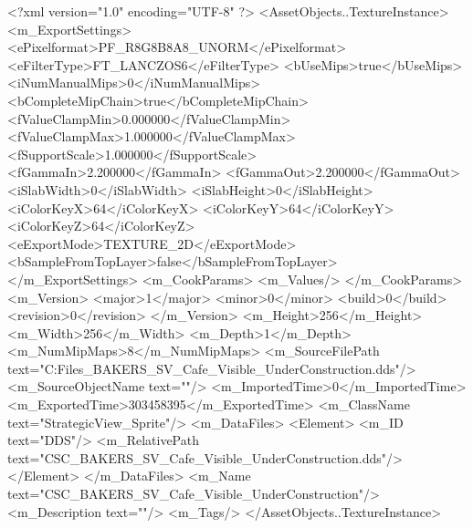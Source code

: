 <?xml version="1.0" encoding="UTF-8" ?>
<AssetObjects..TextureInstance>
	<m_ExportSettings>
		<ePixelformat>PF_R8G8B8A8_UNORM</ePixelformat>
		<eFilterType>FT_LANCZOS6</eFilterType>
		<bUseMips>true</bUseMips>
		<iNumManualMips>0</iNumManualMips>
		<bCompleteMipChain>true</bCompleteMipChain>
		<fValueClampMin>0.000000</fValueClampMin>
		<fValueClampMax>1.000000</fValueClampMax>
		<fSupportScale>1.000000</fSupportScale>
		<fGammaIn>2.200000</fGammaIn>
		<fGammaOut>2.200000</fGammaOut>
		<iSlabWidth>0</iSlabWidth>
		<iSlabHeight>0</iSlabHeight>
		<iColorKeyX>64</iColorKeyX>
		<iColorKeyY>64</iColorKeyY>
		<iColorKeyZ>64</iColorKeyZ>
		<eExportMode>TEXTURE_2D</eExportMode>
		<bSampleFromTopLayer>false</bSampleFromTopLayer>
	</m_ExportSettings>
	<m_CookParams>
		<m_Values/>
	</m_CookParams>
	<m_Version>
		<major>1</major>
		<minor>0</minor>
		<build>0</build>
		<revision>0</revision>
	</m_Version>
	<m_Height>256</m_Height>
	<m_Width>256</m_Width>
	<m_Depth>1</m_Depth>
	<m_NumMipMaps>8</m_NumMipMaps>
	<m_SourceFilePath text="C:\Users\Shadow\Desktop\Working Files\Icons\StrategicView\CSC_BAKERS_SV_Cafe_Visible_UnderConstruction.dds"/>
	<m_SourceObjectName text=""/>
	<m_ImportedTime>0</m_ImportedTime>
	<m_ExportedTime>303458395</m_ExportedTime>
	<m_ClassName text="StrategicView_Sprite"/>
	<m_DataFiles>
		<Element>
			<m_ID text="DDS"/>
			<m_RelativePath text="CSC_BAKERS_SV_Cafe_Visible_UnderConstruction.dds"/>
		</Element>
	</m_DataFiles>
	<m_Name text="CSC_BAKERS_SV_Cafe_Visible_UnderConstruction"/>
	<m_Description text=""/>
	<m_Tags/>
</AssetObjects..TextureInstance>

